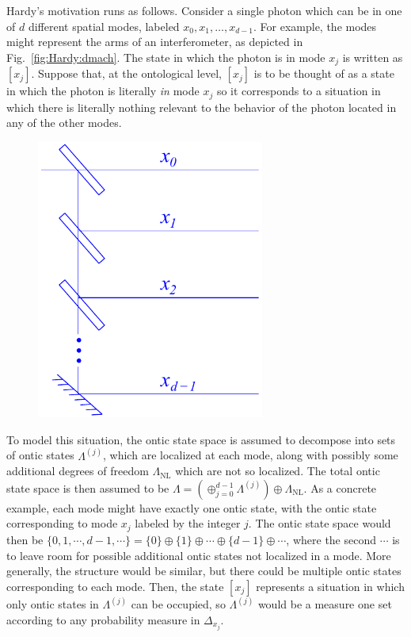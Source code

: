 \documentclass[DIV=calc,paper=a4,fontsize=11pt,twocolumn]{scrartcl} %
\theoremstyle{definition}
\theoremstyle{plain}
\newcommand{\Proj}[1]{\ensuremath{\left [ #1 \right ]}}
\begin{document}
Hardy's motivation runs as follows.  Consider a single photon which
can be in one of $d$ different spatial modes, labeled $x_0, x_1,
\ldots, x_{d-1}$.  For example, the modes might represent the arms of
an interferometer, as depicted in Fig.~\ref{fig:Hardy:dmach}. The
state in which the photon is in mode $x_j$ is written as $\Proj{x_j}$.
Suppose that, at the ontological level, $\Proj{x_j}$ is to be thought
of as a state in which the photon is literally \emph{in} mode $x_j$ so
it corresponds to a situation in which there is literally nothing
relevant to the behavior of the photon located in any of the other
modes.
\begin{figure}[t!]
\centering
\includegraphics[width=75mm]{Fig12.pdf}
\caption{}
\end{figure}
To model this situation, the ontic state space is assumed to decompose
into sets of ontic states $\Lambda^{(j)}$, which are localized at each
mode, along with possibly some additional degrees of freedom
$\Lambda_{\text{NL}}$ which are not so localized.  The total ontic
state space is then assumed to be $\Lambda = \left (
\oplus_{j=0}^{d-1} \Lambda^{(j)} \right ) \oplus
\Lambda_{\text{NL}}$.  As a concrete example, each mode might have
exactly one ontic state, with the ontic state corresponding to mode
$x_j$ labeled by the integer $j$.  The ontic state space would then
be $\{0, 1, \cdots,d-1, \cdots\} = \{0\} \oplus \{1\} \oplus \cdots
\oplus \{d-1\} \oplus \cdots$, where the second $\cdots$ is to leave
room for possible additional ontic states not localized in a mode.
More generally, the structure would be similar, but there could be
multiple ontic states corresponding to each mode.  Then, the state
$\Proj{x_j}$ represents a situation in which only ontic states in
$\Lambda^{(j)}$ can be occupied, so $\Lambda^{(j)}$ would be a measure
one set according to any probability measure in $\Delta_{x_j}$.
\end{document}
